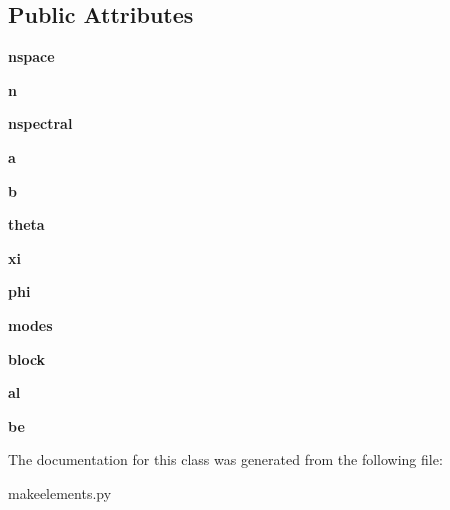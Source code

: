 \subsection*{Public Attributes}
\begin{DoxyCompactItemize}
\item 
\mbox{\label{classmakeelements_1_1Makeelements_a9adcf977328576bb0da4b08999e20ae7}} 
{\bfseries nspace}
\item 
\mbox{\label{classmakeelements_1_1Makeelements_ae64042d8105c79e43b0ac244eac437e3}} 
{\bfseries n}
\item 
\mbox{\label{classmakeelements_1_1Makeelements_abc065c06e73ac4463eaa6d4f8ecb10cb}} 
{\bfseries nspectral}
\item 
\mbox{\label{classmakeelements_1_1Makeelements_a83ec2a5d9a54e317c8d1c9b737a00cea}} 
{\bfseries a}
\item 
\mbox{\label{classmakeelements_1_1Makeelements_a93a780f55c4c8222a3054525ed4da60d}} 
{\bfseries b}
\item 
\mbox{\label{classmakeelements_1_1Makeelements_ae58adb539afbdd6a209062502aa035d7}} 
{\bfseries theta}
\item 
\mbox{\label{classmakeelements_1_1Makeelements_a8ebdcf99e93c82e4571314b96ee78058}} 
{\bfseries xi}
\item 
\mbox{\label{classmakeelements_1_1Makeelements_ad4cfd94a8e8afc278206ee51cb8c71d1}} 
{\bfseries phi}
\item 
\mbox{\label{classmakeelements_1_1Makeelements_a6c9a3993ad6d01846398977466eaafb7}} 
{\bfseries modes}
\item 
\mbox{\label{classmakeelements_1_1Makeelements_a9878956a5ad24f29b2e1eb4e3b73d945}} 
{\bfseries block}
\item 
\mbox{\label{classmakeelements_1_1Makeelements_a9b9d98ee09ac1bdd68fafd508acab6a0}} 
{\bfseries al}
\item 
\mbox{\label{classmakeelements_1_1Makeelements_ab9dfef09639ca2de40ed5b40fc339b40}} 
{\bfseries be}
\end{DoxyCompactItemize}


The documentation for this class was generated from the following file\+:\begin{DoxyCompactItemize}
\item 
makeelements.\+py\end{DoxyCompactItemize}
